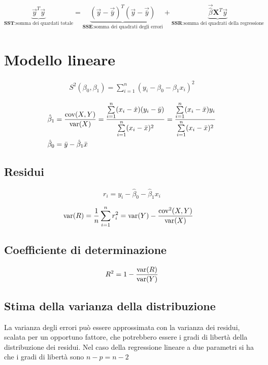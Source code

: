 $$
\underbrace{\vec{y}^T\vec{y}}_{\textbf{SST}: \text{somma dei quardati totale}} = 
\underbrace{(\vec{y} - \vec{\bar{y}})^T (\vec{y} - \vec{\bar{y}})}_{\textbf{SSE}: \text{somma dei quadrati degli errori}} +
\underbrace{\vec{\hat{\beta}} \textbf{X}^T\vec{y}}_{\textbf{SSR}: \text{somma dei quadrati della regressione}}
$$

\section{Modello lineare}

\begin{align*}
S^2(\beta_0, \beta_1) = \sum\limits_{i=1}^n (y_i - \beta_0 - \beta_1 x_i)^2
\end{align*}

\begin{align*}
\hat{\beta}_1 &= \frac{\cov(X,Y)}{\var(X)} 
= \frac{\sum\limits_{i=1}^n (x_i - \hat{x})(y_i - \bar{y})}{\sum\limits_{i=1}^n (x_i - \bar{x})^2} 
= \frac{\sum\limits_{i=1}^n (x_i - \bar{x})y_i}{\sum\limits_{i=1}^n (x_i - \bar{x})^2}  \\
%
\hat{\beta}_0 &= \bar{y} - \hat{\beta}_1 \bar{x}
\end{align*}

\subsection{Residui}

$$
r_i = y_i - \hat{\beta}_0 - \hat{\beta}_1 x_i
$$

\begin{align*}
\text{var}(R) &= \frac{1}{n}\sum\limits_{i=1}^n r_{i}^2
= \text{var}(Y) - \frac{\text{cov}^2(X,Y)}{\text{var}(X)}
\end{align*}

\subsection{Coefficiente di determinazione}

$$
R^2 = 1 - \frac{\text{var}(R)}{\text{var}(Y)}
$$


\subsection{Stima della varianza della distribuzione}

La varianza degli errori può essere approssimata con la varianza dei residui, scalata per un opportuno fattore, che potrebbero essere i gradi di libertà della distribuzione dei residui.
Nel caso della regressione lineare a due parametri si ha che i gradi di libertà sono $ n - p  = n-2 $

